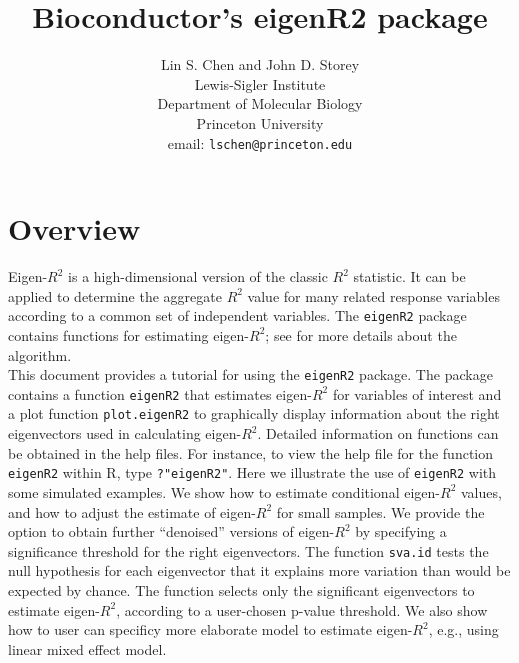 \documentclass[11pt]{article}
\newcommand{\Rfunction}[1]{{\texttt{#1}}}
\newcommand{\Rpackage}[1]{{\texttt{#1}}}
\begin{document}
\title{Bioconductor's eigenR2 package}
\author{Lin S. Chen and John D. Storey \\
Lewis-Sigler Institute \\
Department of Molecular Biology \\
Princeton University \\
email: \texttt{lschen@princeton.edu}}

\maketitle

\tableofcontents


\section{Overview}

Eigen-$R^2$ is a high-dimensional version of the classic $R^2$ statistic.  It can be applied to determine the aggregate $R^2$ value for many related response variables according to a common set of independent variables. The \Rpackage{eigenR2} package contains functions for estimating eigen-$R^2$; see \cite{chen2008} for more details about the algorithm.\\

This document provides a tutorial for using the \texttt{eigenR2} package.  The package contains a function \Rfunction{eigenR2} that estimates eigen-$R^2$ for variables of interest and a plot function \Rfunction{plot.eigenR2} to graphically display information about the right eigenvectors used in calculating eigen-$R^2$. Detailed information on functions can be obtained in the help files. For instance, to view the help file for the function \Rfunction{eigenR2} within R, type \texttt{?"eigenR2"}.  Here we illustrate the use of \Rfunction{eigenR2} with some simulated examples. We show how to estimate conditional eigen-$R^2$ values, and how to adjust the estimate of eigen-$R^2$ for small samples. We provide the option to obtain further ``denoised'' versions of eigen-$R^2$ by specifying a significance threshold for the right eigenvectors. The function \Rfunction{sva.id} \cite{leek2007} tests the null hypothesis for each eigenvector that it explains more variation than would be expected by chance. The function selects only the significant eigenvectors to estimate eigen-$R^2$, according to a user-chosen p-value threshold.  We also show how to user can specificy more elaborate model to estimate eigen-$R^2$, e.g., using linear mixed effect model. 
\end{document}

